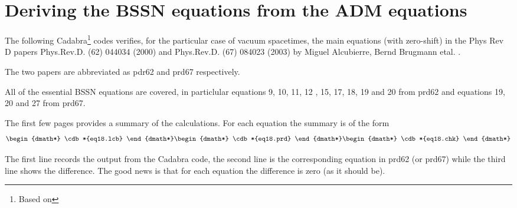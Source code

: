 \documentclass[12pt]{cdblatex}
\begin{document}

















\section*{Deriving the BSSN equations from the ADM equations}

The following Cadabra\footnote{Based on \CdbVersion} codes verifies, for the particular case of vacuum spacetimes,
the main equations (with zero-shift) in the Phys Rev D papers Phys.Rev.D. (62) 044034 (2000) and
Phys.Rev.D. (67) 084023 (2003) by Miguel Alcubierre, Bernd Brugmann etal. .

The two papers are abbreviated as pdr62 and prd67 respectively.

All of the essential BSSN equations are covered, in particlular equations
9, 10, 11, 12 , 15, 17, 18, 19 and 20 from prd62 and equations 19, 20 and 27 from
prd67.

The first few pages provides a summary of the calculations. For each equation the
summary is of the form
%
\begin{dgroup*}
   \begin{dmath*} \cdb*{eq18.lcb} \end{dmath*}
   \begin{dmath*} \cdb*{eq18.prd} \end{dmath*}
   \begin{dmath*} \cdb*{eq18.chk} \end{dmath*}
\end{dgroup*}

The first line records the output from the Cadabra code, the second line is the
corresponding equation in prd62 (or prd67) while the third line shows the difference.
The good news is that for each equation the difference is zero (as it should be).
\end{document}
